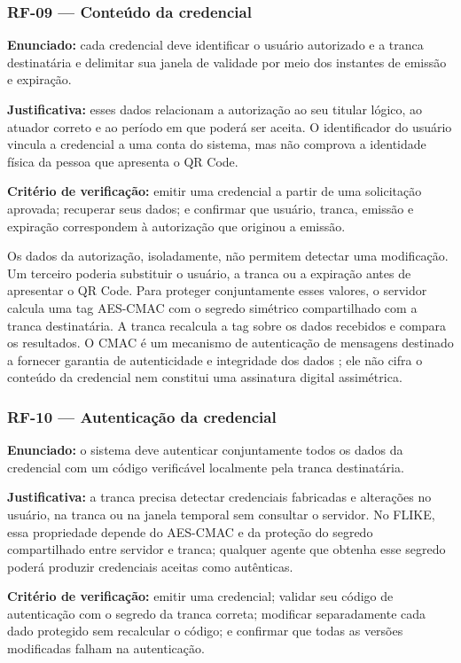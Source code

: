 \subsubsection*{RF-09 --- Conteúdo da credencial}

\textbf{Enunciado:} cada credencial deve identificar o usuário autorizado e a tranca destinatária e delimitar sua janela de validade por meio dos instantes de emissão e expiração.

\textbf{Justificativa:} esses dados relacionam a autorização ao seu titular lógico, ao atuador correto e ao período em que poderá ser aceita. O identificador do usuário vincula a credencial a uma conta do sistema, mas não comprova a identidade física da pessoa que apresenta o QR Code.

\textbf{Critério de verificação:} emitir uma credencial a partir de uma solicitação aprovada; recuperar seus dados; e confirmar que usuário, tranca, emissão e expiração correspondem à autorização que originou a emissão.

Os dados da autorização, isoladamente, não permitem detectar uma modificação. Um terceiro poderia substituir o usuário, a tranca ou a expiração antes de apresentar o QR Code. Para proteger conjuntamente esses valores, o servidor calcula uma tag AES-CMAC com o segredo simétrico compartilhado com a tranca destinatária. A tranca recalcula a tag sobre os dados recebidos e compara os resultados. O CMAC é um mecanismo de autenticação de mensagens destinado a fornecer garantia de autenticidade e integridade dos dados \cite{nist2005cmac}; ele não cifra o conteúdo da credencial nem constitui uma assinatura digital assimétrica.

\subsubsection*{RF-10 --- Autenticação da credencial}

\textbf{Enunciado:} o sistema deve autenticar conjuntamente todos os dados da credencial com um código verificável localmente pela tranca destinatária.

\textbf{Justificativa:} a tranca precisa detectar credenciais fabricadas e alterações no usuário, na tranca ou na janela temporal sem consultar o servidor. No FLIKE, essa propriedade depende do AES-CMAC e da proteção do segredo compartilhado entre servidor e tranca; qualquer agente que obtenha esse segredo poderá produzir credenciais aceitas como autênticas.

\textbf{Critério de verificação:} emitir uma credencial; validar seu código de autenticação com o segredo da tranca correta; modificar separadamente cada dado protegido sem recalcular o código; e confirmar que todas as versões modificadas falham na autenticação.

